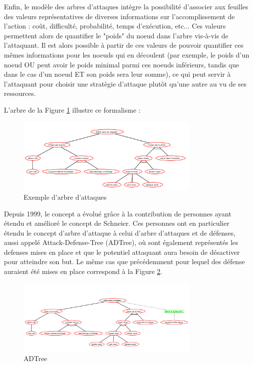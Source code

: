 		Enfin, le modèle des arbres d'attaques intègre la possibilité d'associer aux feuilles des valeurs représentatives de diverses informations sur l'accomplissement de l'action : coût, difficulté, probabilité, temps d'exécution, etc... Ces valeurs permettent alors de quantifier le "poids" du noeud dans l'arbre vis-à-vis de l'attaquant.  Il est alors possible à partir de ces valeurs de pouvoir quantifier ces mêmes informations pour les noeuds qui en découlent (par exemple, le poids d'un noeud OU peut avoir le poids minimal parmi ces noeuds inférieurs, tandis que dans le cas d'un noeud ET son poids sera leur somme), ce qui peut servir à l'attaquant pour choisir une stratègie d'attaque plutôt qu'une autre au vu de ses ressources.

		L'arbre de la Figure \ref{fig:arbre_exemple_1} illustre ce formalisme : 

		\begin{figure}
			\begin{center}
				\includegraphics[width=0.8\textwidth]{figure/Entrer_dans_un_magasin.png}
			\end{center}
			\caption{Exemple d'arbre d'attaques}
			\label{fig:arbre_exemple_1}
		\end{figure}

		Depuis 1999, le concept a évolué grâce à la contribution de personnes ayant étendu et amélioré le concept de Schneier. Ces personnes ont en particulier étendu le concept d'arbre d'attaque à celui d'arbre d'attaques et de défenses, aussi appelé Attack-Defense-Tree (ADTree), où sont également représentés les defenses mises en place et que le potentiel attaquant aura besoin de désactiver pour atteindre son but. Le même cas que précédemment pour lequel des défense auraient été mises en place correspond à la Figure \ref{fig:arbre_exemple_2}.

		\begin{figure}[h!]
            \begin{center}
                \includegraphics[width=0.8\textwidth]{figure/Entrer_dans_un_magasin2.png}
            \end{center}
            \caption{ADTree}
            \label{fig:arbre_exemple_2}
		\end{figure}


